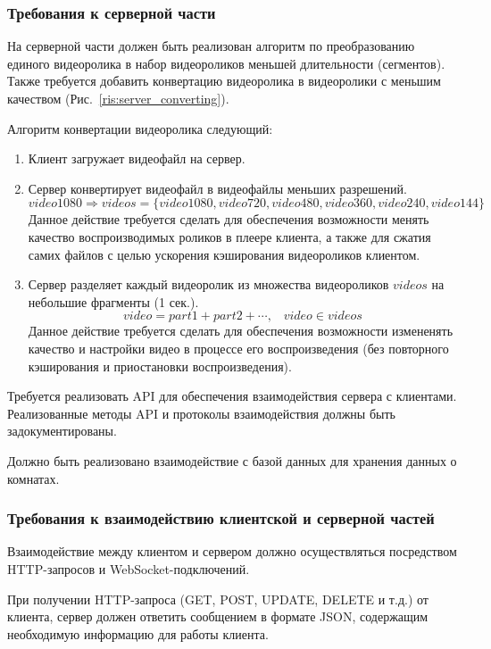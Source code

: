 \newpage

\subsubsection{Требования к серверной части}
На серверной части должен быть реализован алгоритм по преобразованию единого видеоролика в набор видеороликов меньшей длительности
(сегментов).
Также требуется добавить конвертацию видеоролика в видеоролики с меньшим качеством (Рис.~\ref{ris:server_converting}).

Алгоритм конвертации видеоролика следующий:
\begin{enumerate}
    \item Клиент загружает видеофайл на сервер.
    \item Сервер конвертирует видеофайл в видеофайлы меньших разрешений.
    \[ video1080 \Rightarrow videos = \{ video1080, video720, video480, video360, video240, video144 \} \]
    Данное действие требуется сделать для обеспечения возможности менять качество воспроизводимых роликов в плеере клиента,
    а также для сжатия самих файлов с целью ускорения кэширования видеороликов клиентом.
    \item Сервер разделяет каждый видеоролик из множества видеороликов \(videos\) на небольшие фрагменты (1 сек.).
    \[ video = part1 + part2 + \cdots, \;\;\; video \in videos \]
    Данное действие требуется сделать для обеспечения возможности измененять качество и настройки видео в процессе его воспроизведения
    (без повторного кэширования и приостановки воспроизведения).
\end{enumerate}

Требуется реализовать API для обеспечения взаимодействия сервера с клиентами.
Реализованные методы API и протоколы взаимодействия должны быть задокументированы.

Должно быть реализовано взаимодействие с базой данных для хранения данных о комнатах.

\newpage

\subsubsection{Требования к взаимодействию клиентской и серверной частей}
Взаимодействие между клиентом и сервером должно осуществляться посредством HTTP-запросов и WebSocket-подключений.

При получении HTTP-запроса (GET, POST, UPDATE, DELETE и т.д.) от клиента, сервер должен ответить сообщением в формате
JSON, содержащим необходимую информацию для работы клиента.

